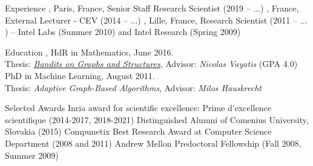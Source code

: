 \documentclass{resume}
\begin{document}
\begin{small}\maketitle\end{small}







\vspace{-2.3em}
\begin{category}{Experience}
\setlength\itemsep{0.2em}
, Paris, France,
Senior Staff Research Scientist (2019 -- $\dots$) 
, France, 
External Lecturer - CEV (2014 -- $\dots$)
, Lille, France,
Research Scientist (2011 -- $\dots$) 
 -- Intel Labs (Summer 2010) and Intel Research 
(Spring 2009)
\end{category}
\vspace{-0.5cm}
\begin{category}{Education}
\setlength\itemsep{0.15em}
, HdR in Mathematics, June 2016.\\
Thesis: \href{http://researchers.lille.inria.fr/~valko/hp/publications/valko2016bandits.pdf}{\emph{Bandits on Graphs and Structures}}, Advisor: \emph{Nicolas Vayatis}
 (GPA 4.0)
PhD in Machine Learning, August 2011. \\ Thesis: \emph{Adaptive Graph-Based Algorithms}, Advisor: \emph{Milos Hauskrecht}
\end{category}
\vspace{-0.5cm}
\begin{category}{Selected Awards}
\setlength\itemsep{0.1em}
	\citemnobullet Inria award for scientific excellence:
Prime d'excellence scientifique (2014-2017, 2018-2021)
\citemnobullet Distinguished Alumni of Comenius University, Slovakia (2015)
	\citemnobullet Compunetix Best Research Award at Computer Science 
Department (2008 
and 2011)	
       \citemnobullet Andrew Mellon Predoctoral Fellowship (Fall 2008, Summer 
2009)	
\end{category}
\end{document}
